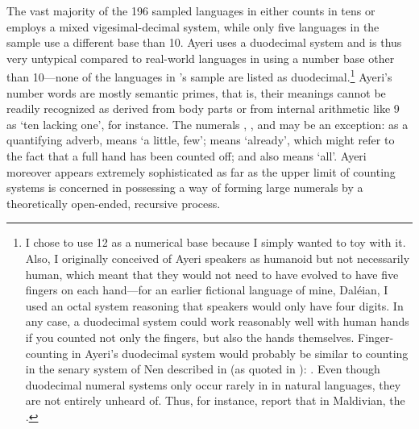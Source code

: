The vast majority of the 196 sampled languages in \citet{wals131} either counts
in tens or employs a mixed vigesimal-decimal system, while only five languages
in the sample use a different base than 10. Ayeri uses a duodecimal system and
is thus very untypical compared to real-world languages in using a number base
other than 10---none of the languages in \citet{wals131}'s sample are listed as
duodecimal.\footnote{I chose to use 12 as a numerical base because I simply
wanted to toy with it. Also, I originally conceived of Ayeri speakers as
humanoid but not necessarily human, which meant that they would not need to
have evolved to have five fingers on each hand---for an earlier fictional
language of mine, Daléian, I used an octal system reasoning that speakers would
only have four digits. In any case, a duodecimal system could work reasonably
well with human hands if you counted not only the fingers, but also the hands
themselves. Finger-counting in Ayeri's duodecimal system would probably be
similar to counting in the senary system of Nen described in
\citet{evans2009} (as quoted in \cite{dixon2012}):
. Even though
duodecimal numeral systems only occur rarely in in natural languages, they are
not entirely unheard of. Thus, for instance, \citet{caingair2000} report that
in Maldivian, the .} Ayeri's number words
are mostly semantic primes, that is, their meanings cannot be readily
recognized as derived from body parts \citep[74]{dixon2012} or from internal
arithmetic like 9 as `ten lacking one', for instance. The numerals
, , and  may
be an exception: as a quantifying adverb,  means `a little, few';
 means `already', which might refer to the fact that a full hand
has been counted off; and  also means `all'. Ayeri moreover
appears extremely sophisticated as far as the upper limit of counting systems
is concerned in possessing a way of forming large numerals by a theoretically
open-ended, recursive process.

